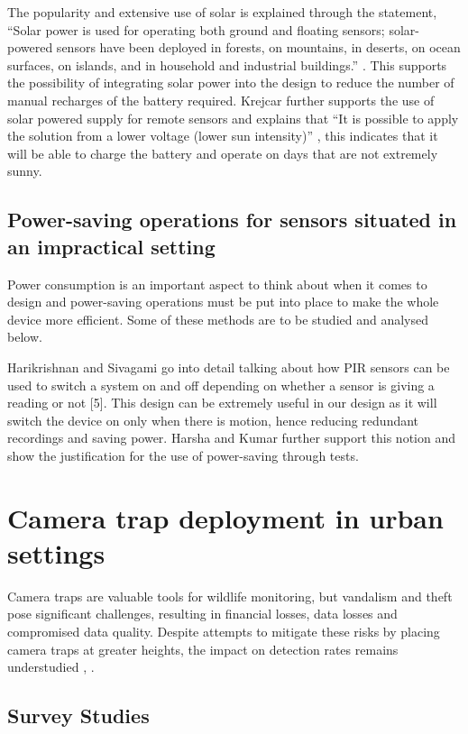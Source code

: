\documentclass[class=report,11pt,crop=false]{standalone}
\begin{document}
The popularity and extensive use of solar is explained through the statement, “Solar power is used for operating both ground and floating sensors; solar-powered sensors have been deployed in forests, on mountains, in deserts, on ocean surfaces, on islands, and in household and industrial buildings.” \cite{dewan2014alternative}. This supports the possibility of integrating solar power into the design to reduce the number of manual recharges of the battery required. Krejcar further supports the use of solar powered supply for remote sensors and explains that “It is possible to apply the solution from a lower voltage (lower sun intensity)” \cite{krejcar2012optimized}, this indicates that it will be able to charge the battery and operate on days that are not extremely sunny.

\subsection{Power-saving operations for sensors situated in an impractical setting}

Power consumption is an important aspect to think about when it comes to design and power-saving operations must be put into place to make the whole device more efficient. Some of these methods are to be studied and analysed below.

Harikrishnan and Sivagami \cite{harikirshnan2017intelligent} go into detail talking about how PIR sensors can be used to switch a system on and off depending on whether a sensor is giving a reading or not [5]. This design can be extremely useful in our design as it will switch the device on only when there is motion, hence reducing redundant recordings and saving power. Harsha and Kumar \cite{harsha2020home} further support this notion and show the justification for the use of power-saving through tests.


\section{Camera trap deployment in urban settings} 

Camera traps are valuable tools for wildlife monitoring, but vandalism and theft pose significant challenges, resulting in financial losses, data losses and compromised data quality. Despite attempts to mitigate these risks by placing camera traps at greater heights, the impact on detection rates remains understudied \cite{meek2016higher}, \cite{meek2019camera}.


\subsection{Survey Studies}
\end{document}
